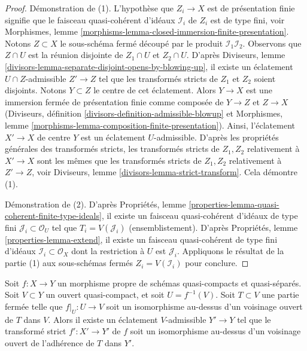 \begin{proof}
Démonstration de (1). L'hypothèse que $Z_i \to X$ est de présentation finie
signifie que le faisceau quasi-cohérent d'idéaux $\mathcal{I}_i$ de $Z_i$
est de type fini, voir
Morphismes, lemme \ref{morphisms-lemma-closed-immersion-finite-presentation}.
Notons $Z \subset X$ le sous-schéma fermé
découpé par le produit $\mathcal{I}_1 \mathcal{I}_2$.
Observons que $Z \cap U$ est la réunion disjointe
de $Z_1 \cap U$ et $Z_2 \cap U$. D'après Diviseurs, lemme
\ref{divisors-lemma-separate-disjoint-opens-by-blowing-up},
il existe un éclatement $U \cap Z$-admissible $Z' \to Z$ tel que
les transformés stricts de $Z_1$ et $Z_2$ soient disjoints.
Notons $Y \subset Z$ le centre de cet éclatement.
Alors $Y \to X$ est une immersion fermée de présentation finie comme composée
de $Y \to Z$ et $Z \to X$ (Diviseurs, définition
\ref{divisors-definition-admissible-blowup}
et Morphismes, lemme \ref{morphisms-lemma-composition-finite-presentation}).
Ainsi, l'éclatement $X' \to X$ de centre $Y$ est un éclatement $U$-admissible.
D'après les propriétés générales des transformés stricts, les
transformés stricts de $Z_1, Z_2$ relativement à $X' \to X$
sont les mêmes que les transformés stricts de $Z_1, Z_2$ relativement
à $Z' \to Z$, voir
Diviseurs, lemme \ref{divisors-lemma-strict-transform}.
Cela démontre (1).

\medskip\noindent
Démonstration de (2). D'après Propriétés, lemme
\ref{properties-lemma-quasi-coherent-finite-type-ideals},
il existe un faisceau quasi-cohérent d'idéaux de type fini
$\mathcal{J}_i \subset \mathcal{O}_U$ tel que
$T_i = V(\mathcal{J}_i)$ (ensemblistement).
D'après Propriétés, lemme \ref{properties-lemma-extend},
il existe un faisceau quasi-cohérent de type fini
d'idéaux $\mathcal{I}_i \subset \mathcal{O}_X$
dont la restriction à $U$ est $\mathcal{J}_i$.
Appliquons le résultat de la partie (1) aux
sous-schémas fermés $Z_i = V(\mathcal{I}_i)$ pour conclure.
\end{proof}

\begin{lemma}
\label{lemma-blowup-iso-along}
Soit $f : X \to Y$ un morphisme propre de schémas quasi-compacts et
quasi-séparés. Soit $V \subset Y$ un ouvert quasi-compact,
et soit $U = f^{-1}(V)$. Soit $T \subset V$ une partie fermée telle que
$f|_U : U \to V$ soit un isomorphisme au-dessus d'un voisinage ouvert de $T$
dans $V$. Alors il existe un éclatement $V$-admissible $Y' \to Y$
tel que le transformé strict $f' : X' \to Y'$ de $f$
soit un isomorphisme au-dessus d'un voisinage ouvert de l'adhérence
de $T$ dans $Y'$.
\end{lemma}

